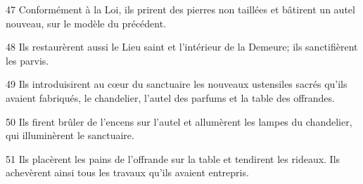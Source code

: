 
47 Conformément à la Loi, ils prirent des pierres non taillées et bâtirent un autel nouveau, sur le modèle du précédent.

48 Ils restaurèrent aussi le Lieu saint et l’intérieur de la Demeure; ils sanctifièrent les parvis.

49 Ils introduisirent au cœur du sanctuaire les nouveaux ustensiles sacrés qu’ils avaient fabriqués, le chandelier, l’autel des parfums et la table des offrandes.

50 Ils firent brûler de l’encens sur l’autel et allumèrent les lampes du chandelier, qui illuminèrent le sanctuaire.

51 Ils placèrent les pains de l’offrande sur la table et tendirent les rideaux. Ils achevèrent ainsi tous les travaux qu’ils avaient entrepris.